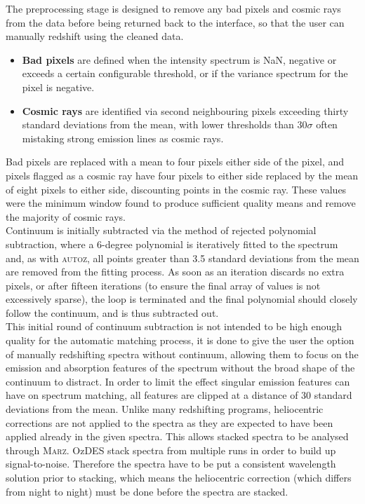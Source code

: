 \documentclass[iop]{emulateapj}
\newcommand{\autoz}{\textsc{autoz}}
\newcommand{\marz}{\textsc{Marz}}
\begin{document}
The preprocessing stage is designed to remove any bad pixels and cosmic rays from the data before being returned back to the interface, so that the user can manually redshift using the cleaned data.
\begin{itemize}
\item \textbf{Bad pixels} are defined when the intensity spectrum is NaN, negative or exceeds a certain configurable threshold, or if the variance spectrum for the pixel is negative.
\item \textbf{Cosmic rays} are identified via second neighbouring pixels exceeding thirty standard deviations from the mean, with lower thresholds than $30\sigma$ often mistaking strong emission lines as cosmic rays. 
\end{itemize}
Bad pixels are replaced with a mean to four pixels either side of the pixel, and pixels flagged as a cosmic ray have four pixels to either side replaced by the mean of eight pixels to either side, discounting points in the cosmic ray. These values were the minimum window found to produce sufficient quality means and remove the majority of cosmic rays.\\

Continuum is initially subtracted via the method of rejected polynomial subtraction, where a 6-degree polynomial is iteratively fitted to the spectrum and, as with \autoz{}, all points greater than 3.5 standard deviations from the mean are removed from the fitting process. As soon as an iteration discards no extra pixels, or after fifteen iterations (to ensure the final array of values is not excessively sparse), the loop is terminated and the final polynomial should closely follow the continuum, and is thus subtracted out.\\

This initial round of continuum subtraction is not intended to be high enough quality for the automatic matching process, it is done to give the user the option of manually redshifting spectra without continuum, allowing them to focus on the emission and absorption features of the spectrum without the broad shape of the continuum to distract. In order to limit the effect singular emission features can have on spectrum matching, all features are clipped at a distance of 30 standard deviations from the mean. Unlike many redshifting programs, heliocentric corrections are not applied to the spectra as they are expected to have been applied already in the given spectra. This allows stacked spectra to be analysed through \marz{}. OzDES stack spectra from multiple runs in order to build up signal-to-noise. Therefore the spectra have to be put a consistent wavelength solution prior to stacking, which means the heliocentric correction (which differs from night to night) must be done before the spectra are stacked.\\
\end{document}
